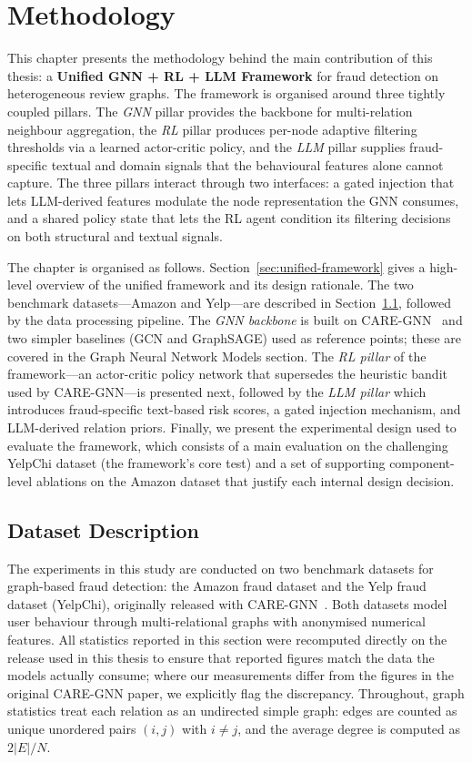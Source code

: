 \chapter{Methodology}

This chapter presents the methodology behind the main contribution of this thesis: a \textbf{Unified GNN + RL + LLM Framework} for fraud detection on heterogeneous review graphs. The framework is organised around three tightly coupled pillars. The \emph{GNN} pillar provides the backbone for multi-relation neighbour aggregation, the \emph{RL} pillar produces per-node adaptive filtering thresholds via a learned actor-critic policy, and the \emph{LLM} pillar supplies fraud-specific textual and domain signals that the behavioural features alone cannot capture. The three pillars interact through two interfaces: a gated injection that lets LLM-derived features modulate the node representation the GNN consumes, and a shared policy state that lets the RL agent condition its filtering decisions on both structural and textual signals.

The chapter is organised as follows. Section~\ref{sec:unified-framework} gives a high-level overview of the unified framework and its design rationale. The two benchmark datasets---Amazon and Yelp---are described in Section~\ref{sec:datasets}, followed by the data processing pipeline. The \emph{GNN backbone} is built on CARE-GNN~\cite{dou2020enhancing} and two simpler baselines (GCN and GraphSAGE) used as reference points; these are covered in the Graph Neural Network Models section. The \emph{RL pillar} of the framework---an actor-critic policy network that supersedes the heuristic bandit used by CARE-GNN---is presented next, followed by the \emph{LLM pillar} which introduces fraud-specific text-based risk scores, a gated injection mechanism, and LLM-derived relation priors. Finally, we present the experimental design used to evaluate the framework, which consists of a main evaluation on the challenging YelpChi dataset (the framework's core test) and a set of supporting component-level ablations on the Amazon dataset that justify each internal design decision.

\section{Dataset Description}
\label{sec:datasets}

The experiments in this study are conducted on two benchmark datasets for graph-based fraud detection: the Amazon fraud dataset and the Yelp fraud dataset (YelpChi), originally released with CARE-GNN~\cite{dou2020enhancing}. Both datasets model user behaviour through multi-relational graphs with anonymised numerical features. All statistics reported in this section were recomputed directly on the release used in this thesis to ensure that reported figures match the data the models actually consume; where our measurements differ from the figures in the original CARE-GNN paper, we explicitly flag the discrepancy. Throughout, graph statistics treat each relation as an undirected simple graph: edges are counted as unique unordered pairs $(i,j)$ with $i\neq j$, and the average degree is computed as $2|E|/N$.

